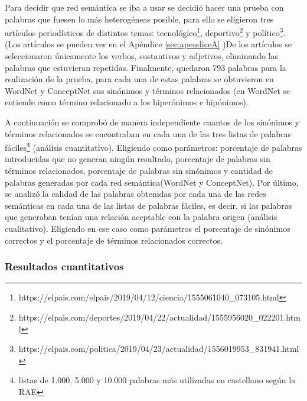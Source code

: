 Para decidir que red semántica se iba a usar se decidió hacer una prueba con palabras que fuesen lo más heterogéneas posible, para ello se eligieron tres artículos periodísticos de distintos temas: tecnológico\footnote{https://elpais.com/elpais/2019/04/12/ciencia/1555061040\_073105.html}, deportivo\footnote{https://elpais.com/deportes/2019/04/22/actualidad/1555956020\_022201.html} y político\footnote{https://elpais.com/politica/2019/04/23/actualidad/1556019953\_831941.html}. (Los artículos se pueden ver en el Apéndice \ref{sec:apendiceA} )De los artículos se seleccionaron únicamente los verbos, sustantivos y adjetivos, eliminando las palabras que estuvieran repetidas. Finalmente, quedaron 793 palabras para la realización de la prueba, para cada una de estas palabras se obtuvieron en WordNet y ConceptNet sus sinónimos y términos relacionados (en WordNet se entiende como término relacionado a los hiperónimos e hipónimos).

A continuación se comprobó de manera independiente cuantos de los sinónimos y términos relacionados se encontraban en cada una de las tres listas de palabras fáciles\footnote{listas de 1.000, 5.000 y 10.000 palabras más utilizadas en castellano según la RAE} (análisis cuantitativo). Eligiendo como parámetros: porcentaje de palabras introducidas que no generan ningún resultado, porcentaje de palabras sin términos relacionados, porcentaje de palabras sin sinónimos  y cantidad de palabras generadas por cada red semántica(WordNet y ConceptNet). Por último, se analizó la calidad de las palabras obtenidas por cada una de las redes semánticas en cada una de las listas de palabras fáciles, es decir, si las palabras que generaban tenían una relación aceptable con la palabra origen (análisis cualitativo). Eligiendo en ese caso como parámetros el porcentaje de sinónimos correctos y el porcentaje de términos relacionados correctos.

\subsubsection{Resultados cuantitativos}
\label{cap:sec:pruebaCuantitativa}

